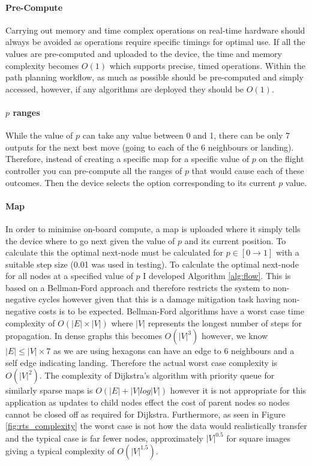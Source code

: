 \paragraph{Pre-Compute}
Carrying out memory and time complex operations on real-time hardware should always be avoided as operations require specific timings for optimal use. If all the values are pre-computed and uploaded to the device, the time and memory complexity becomes $O(1)$ which supports precise, timed operations. Within the path planning workflow, as much as possible should be pre-computed and simply accessed, however, if any algorithms are deployed they should be $O(1)$.
\paragraph{$p$ ranges}
While the value of $p$ can take any value between 0 and 1, there can be only 7 outputs for the next best move (going to each of the 6 neighbours or landing). Therefore, instead of creating a specific map for a specific value of $p$ on the flight controller you can pre-compute all the ranges of $p$ that would cause each of these outcomes. Then the device selects the option corresponding to its current $p$ value.
\paragraph{Map}

In order to minimise on-board compute, a map is uploaded where it simply tells the device where to go next given the value of $p$ and its current position. To calculate this the optimal next-node must be calculated for $p\in[0\to1]$ with a suitable step size (0.01 was used in testing).  To calculate the optimal next-node for all nodes at a specified value of $p$ I developed Algorithm \ref{alg:flow}. This is based on a Bellman-Ford approach and therefore restricts the system to non-negative cycles however given that this is a damage mitigation task having non-negative costs is to be expected.  Bellman-Ford algorithms have a worst case time complexity of $O(|E|\times |V|)$ where $|V|$ represents the longest number of steps for propagation. In dense graphs this becomes  $O(|V|^3)$ however, we know $|E| \leq |V| \times 7$ as we are using hexagons can have an edge to 6 neighbours and a self edge indicating landing. Therefore the actual worst case complexity is $O(|V|^2)$\cite{cormen2009}. The complexity of Dijkstra's algorithm with priority queue for similarly sparse maps is $O(|E| + |V|log|V|)$ however it is not appropriate for this application as updates to child nodes effect the cost of parent nodes so nodes cannot be closed off as required for Dijkstra. Furthermore, as seen in Figure \ref{fig:rts_complexity} the worst case is not how the data would realistically transfer and the typical case is far fewer nodes, approximately $|V|^{0.5}$ for square images giving a typical complexity of $O(|V|^{1.5})$.

